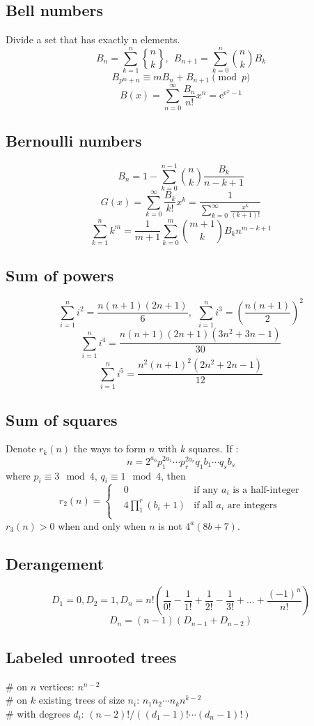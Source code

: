 	\subsection{Bell numbers}
	Divide a set that has exactly n elements.
	\[ B_n=\sum_{k=1}^{n}{n\brace k},\ \ B_{n+1} = \sum_{k=0}^n{n \choose k}B_k \]
	\[ B_{p^m+n} \equiv mB_n+B_{n+1} \pmod{p} \]
	\[B(x)=\sum_{n=0}^{\infty}\frac{B_n}{n!}x^n=\mathrm{e}^{\mathrm{e}^x-1}\]
	\subsection{Bernoulli numbers}
	\[ B_n = 1 - \sum_{k=0}^{n-1}{n \choose k}\frac{B_k}{n-k+1} \]
	\[ G(x) = \sum_{k=0}^{\infty}\frac{B_k}{k!}x^k
	= \frac{1}{\sum_{k=0}^{\infty}\frac{x^k}{(k+1)!}} \]
	\[ \sum_{k=1}^nk^m = \frac{1}{m+1}\sum_{k=0}^m{m+1 \choose k}B_kn^{m-k+1} \]
	\subsection{Sum of powers}
	\[\sum_{i=1}^ni^2=\frac{n(n+1)(2n+1)}{6},\ \ \sum_{i=1}^ni^3=(\frac{n(n+1)}{2})^2\]
	\[\sum_{i=1}^ni^4=\frac{n(n+1)(2n+1)(3n^2+3n-1)}{30}\]
	\[\sum_{i=1}^ni^5=\frac{n^2(n+1)^2(2n^2+2n-1)}{12}\]
	\subsection{Sum of squares}
	Denote $r_k(n)$ the ways to form $n$ with $k$ squares. If :
	\[n=2^{a_0}p_1^{2a_1}\cdots p_r^{2a_r}q_1{b_1}\cdots q_s{b_s}\]
	where $p_i\equiv 3 \mod 4$, $q_i\equiv 1 \mod 4$, then
	\[r_2(n)=\left\{\begin{aligned}
	& 0 & \text{if any }a_i\text{ is a half-integer}\\
	& 4\prod_1^r(b_i+1) & \text{if all }a_i\text{ are integers}\\
	\end{aligned}\right.\]
	$r_3(n)>0$ when and only when $n$ is not $4^a(8b+7)$.
	\subsection{Derangement}
	\[D_1=0,D_2=1,D_n=n!(\frac{1}{0!}-\frac{1}{1!}+\frac{1}{2!}-\frac{1}{3!}+...+\frac{(-1)^n}{n!})\]
	\[D_n=(n-1)(D_{n-1}+D_{n-2})\]
	\subsection{Labeled unrooted trees}
		\# on $n$ vertices: $n^{n-2}$ \\
		\# on $k$ existing trees of size $n_i$: $n_1n_2\cdots n_k n^{k-2}$ \\
		\# with degrees $d_i$: $(n-2)! / ((d_1-1)! \cdots (d_n-1)!)$
